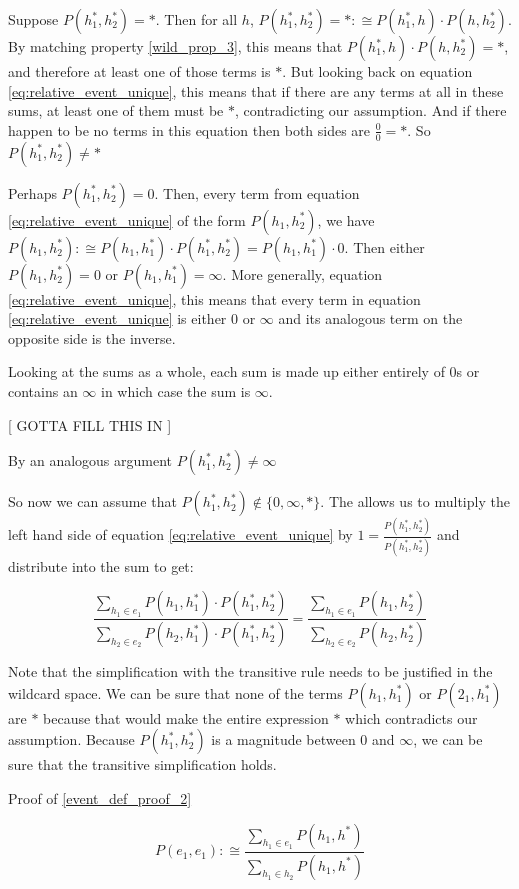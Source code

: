 \documentclass[twoside]{article}
\theoremstyle{plain}%
\theoremstyle{definition}
\theoremstyle{remark}
\begin{document}
Suppose \(P(h_1^*, h_2^*) = \ast\). Then for all \(h\), \(P(h_1^*, h_2^*) = \ast :\cong P(h_1^*, h) \cdot P(h, h_2^*)\). By matching property \ref{wild_prop_3}, this means that \(P(h_1^*, h) \cdot P(h, h_2^*) = \ast\), and therefore at least one of those terms is \(\ast\). But looking back on equation \ref{eq:relative_event_unique}, this means that if there are any terms at all in these sums, at least one of them must be \(\ast\), contradicting our assumption. And if there happen to be no terms in this equation then both sides are \(\frac{0}{0}=\ast\). So \(P(h_1^*, h_2^*) \neq \ast\)

Perhaps \(P(h_1^*, h_2^*) = 0\). Then, every term from equation \ref{eq:relative_event_unique} of the form \(P(h_1, h_2^*)\), we have \(P(h_1, h_2^*):\cong P(h_1, h_1^*) \cdot P(h_1^*, h_2^*) = P(h_1, h_1^*) \cdot 0\). Then either \(P(h_1, h_2^*) = 0\) or \(P(h_1, h_1^*) = \infty\). More generally, equation \ref{eq:relative_event_unique}, this means that every term in equation \ref{eq:relative_event_unique} is either \(0\) or \(\infty\) and its analogous term on the opposite side is the inverse.

Looking at the sums as a whole, each sum is made up either entirely of 0s or contains an \(\infty\) in which case the sum is \(\infty\).

[ GOTTA FILL THIS IN ]

By an analogous argument  \(P(h_1^*, h_2^*) \neq \infty\)

So now we can assume that \(P(h_1^*, h_2^*) \notin \{0, \infty, \ast\} \). The allows us to multiply the left hand side of equation \ref{eq:relative_event_unique} by \(1 = \frac{P(h_1^*, h_2^*)}{P(h_1^*, h_2^*)}\) and distribute into the sum to get:

\[\frac{\sum_{h_1 \in e_1} P(h_1, h_1^*) \cdot P(h_1^*, h_2^*)}{\sum_{h_2 \in e_2} P(h_2, h_1^*) \cdot P(h_1^*, h_2^*)} = \frac{\sum_{h_1 \in e_1} P(h_1, h_2^*)}{\sum_{h_2 \in e_2} P(h_2, h_2^*)}\]

Note that the simplification with the transitive rule needs to be justified in the wildcard space. We can be sure that none of the terms \(P(h_1, h_1^*)\) or \( P(2_1, h_1^*)\) are \(\ast\) because that would make the entire expression \(\ast\) which contradicts our assumption. Because \(P(h_1^*, h_2^*)\) is a magnitude between 0 and \(\infty\), we can be sure that the transitive simplification holds.

Proof of \ref{event_def_proof_2}

\[P(e_1, e_1) :\cong \frac{\sum_{h_1 \in e_1} P(h_1, h^*)}{\sum_{h_1 \in h_2} P(h_1, h^*)}\]
\end{document}
